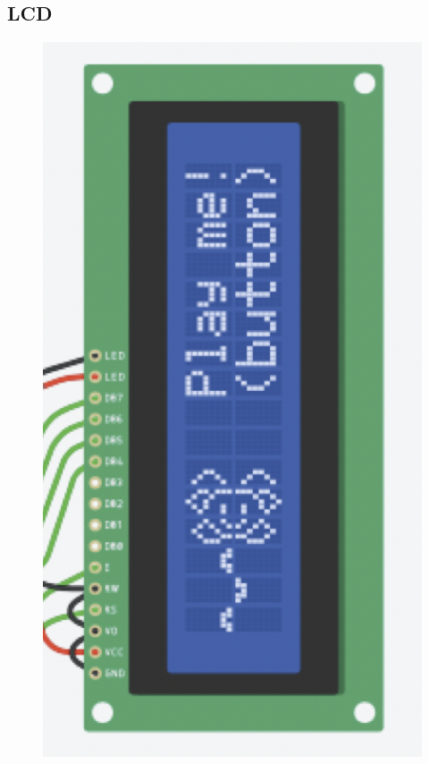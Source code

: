 \documentclass[a4paper]{article}
\begin{document}
\subsection{LCD}

\begin{figure}
  \vspace{-25pt}
  \begin{center}
    \includegraphics[width=1.1\linewidth]{lcd.png}
  \end{center}
\vspace{-25pt}
\end{figure}
\end{document}
